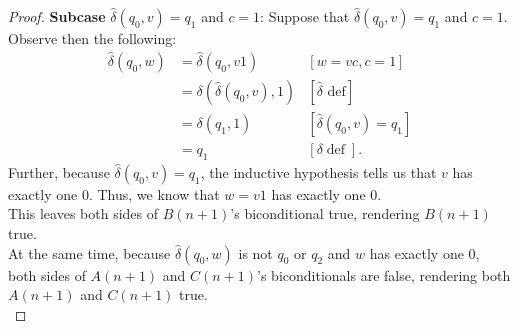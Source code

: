 \documentclass[10pt]{article}
\begin{document}
\begin{enumerate}[label={}]
\begin{proof}
              \textbf{Subcase }$\hat{\delta}\left(q_0, v\right)=q_1$ and $c=1$: Suppose that $\hat{\delta}\left(q_0, v\right)=q_1$ and $c=1$. Observe then the following:
              $$
                  \begin{aligned}
                      \hat{\delta}\left(q_0, w\right) & =\hat{\delta}\left(q_0, v 1\right)                    & {[w=v c, c=1] }                                     \\
                                                      & =\delta\left(\hat{\delta}\left(q_0, v\right),1\right) & {[\hat{\delta} \text { def}] }                      \\
                                                      & =\delta\left(q_1, 1\right)                            & {\left[\hat{\delta}\left(q_0, v\right)=q_1\right] } \\
                                                      & =q_1                                                  & {[\delta \operatorname{def}] . }
                  \end{aligned}
              $$
              Further, because $\hat{\delta}\left(q_0, v\right)=q_1$, the inductive hypothesis tells us that $v$ has exactly one 0. Thus, we know that $w=v1$ has exactly one 0.\\
              This leaves both sides of $B(n+1)$'s biconditional true, rendering $B(n+1)$ true.\\
              At the same time, because $\hat{\delta}\left(q_0, w\right)$ is not $q_0$ or $q_2$ and $w$ has exactly one 0, both sides of $A(n+1)$ and $C(n+1)$'s biconditionals are false, rendering both $A(n+1)$ and $C(n+1)$ true.\\


\end{proof}
\end{enumerate}
\end{document}
